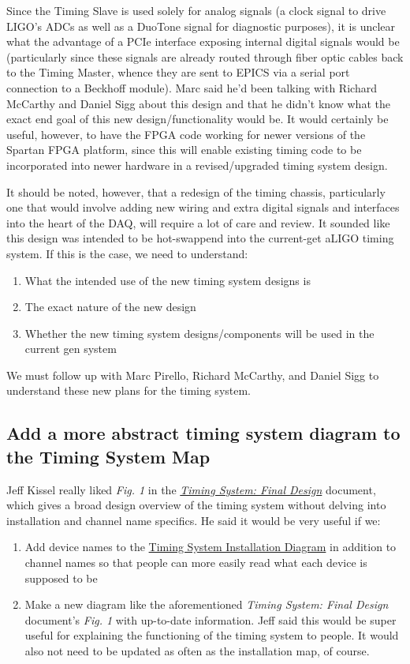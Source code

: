 \documentclass{article}
\newcommand*{\TODO}{\textcolor{todo}}
\begin{document}
Since the Timing Slave is used solely for analog signals (a clock signal to drive LIGO's ADCs as well as a DuoTone signal for diagnostic purposes), it is unclear what the advantage of a PCIe interface exposing internal digital signals would be (particularly since these signals are already routed through fiber optic cables back to the Timing Master, whence they are sent to EPICS via a serial port connection to a Beckhoff module). Marc said he'd been talking with Richard McCarthy and Daniel Sigg about this design and that he didn't know what the exact end goal of this new design/functionality would be. It would certainly be useful, however, to have the FPGA code working for newer versions of the Spartan FPGA platform, since this will enable existing timing code to be incorporated into newer hardware in a revised/upgraded timing system design.

It should be noted, however, that a redesign of the timing chassis, particularly one that would involve adding new wiring and extra digital signals and interfaces into the heart of the DAQ, will require a lot of care and review. It sounded like this design was intended to be hot-swappend into the current-get aLIGO timing system. If this is the case, we need to understand:

\begin{enumerate}
    \item What the intended use of the new timing system designs is
    \item The exact nature of the new design
    \item Whether the new timing system designs/components will be used in the current gen system
\end{enumerate}

\TODO{We must follow up with Marc Pirello, Richard McCarthy, and Daniel Sigg to understand these new plans for the timing system.}

\subsection{Add a more abstract timing system diagram to the Timing System Map}

Jeff Kissel really liked \textit{Fig. 1} in the \textit{\href{https://dcc.ligo.org/LIGO-T070173}{Timing System: Final Design}} document, which gives a broad design overview of the timing system without delving into installation and channel name specifics. He said it would be very useful if we:

\begin{enumerate}
    \item{\TODO{Add device names} to the \href{https://dcc.ligo.org/LIGO-D1500201}{Timing System Installation Diagram} in addition to channel names so that people can more easily read what each device is supposed to be}
    \item{\TODO{Make a new diagram like the aforementioned \textit{Timing System: Final Design} document's \textit{Fig. 1} with up-to-date information}. Jeff said this would be super useful for explaining the functioning of the timing system to people. It would also not need to be updated as often as the installation map, of course.}
\end{enumerate}
\end{document}

